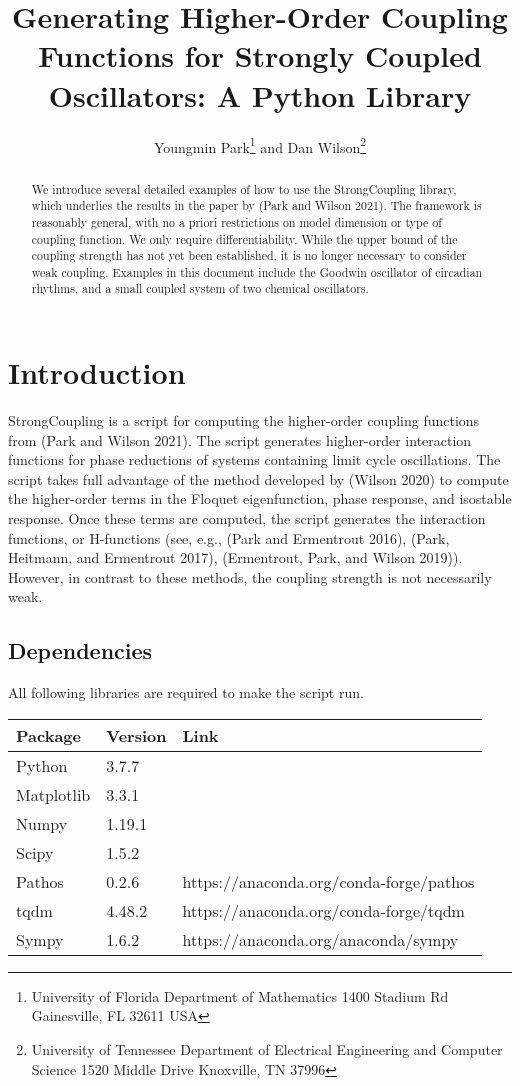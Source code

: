 \documentclass[english,a4paper,oneside]{article}
\title{Generating Higher-Order Coupling Functions for Strongly Coupled
Oscillators: A Python Library}
\author{Youngmin Park\footnote{University of Florida Department of Mathematics
  1400 Stadium Rd Gainesville, FL 32611 USA} and Dan Wilson\footnote{University
  of Tennessee Department of Electrical Engineering and Computer Science
  1520 Middle Drive Knoxville, TN 37996}}
\date{}
\begin{document}
\maketitle
\begin{abstract}
We introduce several detailed examples of how to use the StrongCoupling
library, which underlies the results in the paper by (Park and Wilson
2021). The framework is reasonably general, with no a priori
restrictions on model dimension or type of coupling function. We only
require differentiability. While the upper bound of the coupling
strength has not yet been established, it is no longer necessary to
consider weak coupling. Examples in this document include the Goodwin
oscillator of circadian rhythms, and a small coupled system of two
chemical oscillators.
\end{abstract}

{
\hypersetup{linkcolor=}
\setcounter{tocdepth}{4}
\tableofcontents
}
\hypertarget{introduction}{%
\section{Introduction}\label{introduction}}

StrongCoupling is a script for computing the higher-order coupling
functions from (Park and Wilson 2021). The script generates higher-order
interaction functions for phase reductions of systems containing limit
cycle oscillations. The script takes full advantage of the method
developed by (Wilson 2020) to compute the higher-order terms in the
Floquet eigenfunction, phase response, and isostable response. Once
these terms are computed, the script generates the interaction
functions, or H-functions (see, e.g., (Park and Ermentrout 2016), (Park,
Heitmann, and Ermentrout 2017), (Ermentrout, Park, and Wilson 2019)).
However, in contrast to these methods, the coupling strength is not
necessarily weak.

\hypertarget{dependencies}{%
\subsection{Dependencies}\label{dependencies}}

All following libraries are required to make the script run.

\begin{longtable}[]{@{}lll@{}}
\toprule
Package & Version & Link\tabularnewline
\midrule
\endhead
Python & 3.7.7 &\tabularnewline
Matplotlib & 3.3.1 &\tabularnewline
Numpy & 1.19.1 &\tabularnewline
Scipy & 1.5.2 &\tabularnewline
Pathos & 0.2.6 & https://anaconda.org/conda-forge/pathos\tabularnewline
tqdm & 4.48.2 & https://anaconda.org/conda-forge/tqdm\tabularnewline
Sympy & 1.6.2 & https://anaconda.org/anaconda/sympy\tabularnewline
\bottomrule
\end{longtable}
\end{document}
